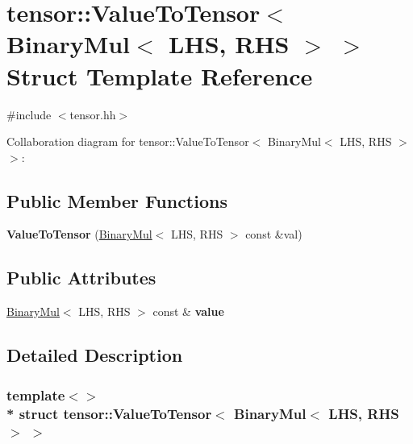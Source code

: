 \hypertarget{structtensor_1_1ValueToTensor_3_01BinaryMul_3_01LHS_00_01RHS_01_4_01_4}{}\section{tensor\+:\+:Value\+To\+Tensor$<$ Binary\+Mul$<$ L\+HS, R\+HS $>$ $>$ Struct Template Reference}
\label{structtensor_1_1ValueToTensor_3_01BinaryMul_3_01LHS_00_01RHS_01_4_01_4}


{\ttfamily \#include $<$tensor.\+hh$>$}



Collaboration diagram for tensor\+:\+:Value\+To\+Tensor$<$ Binary\+Mul$<$ L\+HS, R\+HS $>$ $>$\+:
\subsection*{Public Member Functions}
\begin{DoxyCompactItemize}
\item 
{\bfseries Value\+To\+Tensor} (\hyperlink{classtensor_1_1BinaryMul}{Binary\+Mul}$<$ L\+HS, R\+HS $>$ const \&val)\hypertarget{structtensor_1_1ValueToTensor_3_01BinaryMul_3_01LHS_00_01RHS_01_4_01_4_a7a0b6959935280e95305b856f50e34ea}{}\label{structtensor_1_1ValueToTensor_3_01BinaryMul_3_01LHS_00_01RHS_01_4_01_4_a7a0b6959935280e95305b856f50e34ea}

\end{DoxyCompactItemize}
\subsection*{Public Attributes}
\begin{DoxyCompactItemize}
\item 
\hyperlink{classtensor_1_1BinaryMul}{Binary\+Mul}$<$ L\+HS, R\+HS $>$ const \& {\bfseries value}\hypertarget{structtensor_1_1ValueToTensor_3_01BinaryMul_3_01LHS_00_01RHS_01_4_01_4_a850333c2abbbd2bd4814cab561397dad}{}\label{structtensor_1_1ValueToTensor_3_01BinaryMul_3_01LHS_00_01RHS_01_4_01_4_a850333c2abbbd2bd4814cab561397dad}

\end{DoxyCompactItemize}


\subsection{Detailed Description}
\subsubsection*{template$<$$>$\\*
struct tensor\+::\+Value\+To\+Tensor$<$ Binary\+Mul$<$ L\+H\+S, R\+H\+S $>$ $>$}

